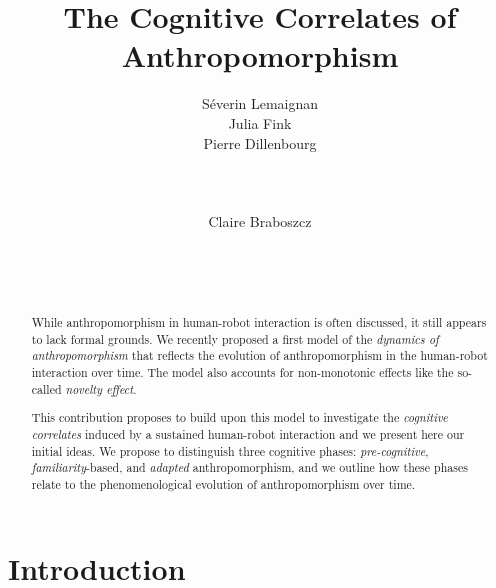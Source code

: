 \documentclass{sig-alternate-2013}
\begin{document}
\title{The Cognitive Correlates of Anthropomorphism}

\author{
\alignauthor
Séverin Lemaignan\\
Julia Fink\\
Pierre Dillenbourg\\
    \\
    \\
    \\
\alignauthor
Claire Braboszcz\\
    \\
    \\
    \\
}

\maketitle

\begin{abstract}

While anthropomorphism in human-robot interaction is often discussed, it still
appears to lack formal grounds. We recently proposed a first model of the
\emph{dynamics of anthropomorphism} that reflects the
evolution of anthropomorphism in the human-robot interaction over time. The
model also accounts for non-monotonic effects like the so-called \emph{novelty
effect}.

This contribution proposes to build upon this model to investigate the
\emph{cognitive correlates} induced by a sustained human-robot interaction and
we present here our initial ideas. We propose to distinguish three cognitive
phases: \emph{pre-cognitive}, \emph{familiarity}-based, and \emph{adapted}
anthropomorphism, and we outline how these phases relate to the phenomenological
evolution of anthropomorphism over time.

\end{abstract}


\section{Introduction}
\label{sec:intro}
\end{document}
